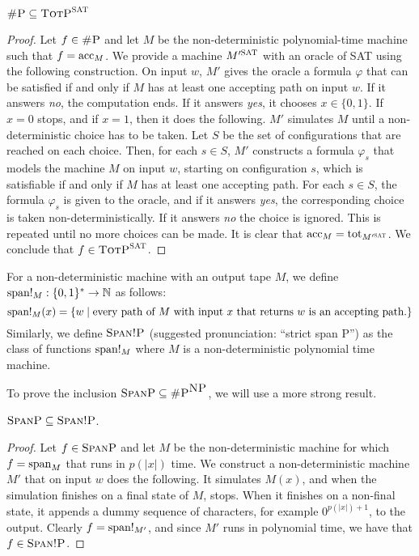 \begin{theo}
	$\shp \subseteq \totp^{\textsc{SAT}}$
\end{theo}
\begin{proof}
	Let $f\in\shp$ and let $M$ be the non-deterministic polynomial-time machine such that $f = \acc_M$. We provide a machine $M'^{\textsc{SAT}}$ with an oracle of SAT using the following construction. On input $w$, $M'$ gives the oracle a formula $\varphi$ that can be satisfied if and only if $M$ has at least one accepting path on input $w$. If it answers {\it no}, the computation ends. If it answers {\it yes}, it chooses $x\in\{0,1\}$. If $x = 0$ stops, and if $x = 1$, then it does the following. $M'$ simulates $M$ until a non-deterministic choice has to be taken. Let $S$ be the set of configurations that are reached on each choice. Then, for each $s\in S$, $M'$ constructs a formula $\varphi_s$ that models the machine $M$ on input $w$, starting on configuration $s$, which is satisfiable if and only if $M$ has at least one accepting path. For each $s\in S$, the formula $\varphi_s$ is given to the oracle, and if it answers {\it yes}, the corresponding choice is taken non-deterministically. If it answers {\it no} the choice is ignored. This is repeated until no more choices can be made. It is clear that $\acc_M = \tot_{M'^{\textsc{SAT}}}$. We conclude that $f\in\totp^{\textsc{SAT}}$.
\end{proof}

For a non-deterministic machine with an output tape $M$, we define $\sp!_M:\{0,1\}^*\to\N$ as follows:
\[
	\sp!_M(x) = \{w \mid \text{every path of $M$ with input $x$ that returns $w$ is an accepting path.} \}
\]
Similarly, we define $\stspanp$ (suggested pronunciation: ``strict span P'') as the class of functions $\sp!_M$ where $M$ is a non-deterministic polynomial time machine.

To prove the inclusion $\spanp \subseteq \shp^{\np}$, we will use a more strong result.

\begin{theo}
	$\spanp \subseteq \stspanp$.
\end{theo}
\begin{proof}
	Let $f \in \spanp$ and let $M$ be the non-deterministic machine for which $f = \sp_M$ that runs in $p(\vert x \vert)$ time. We construct a non-deterministic machine $M'$ that on input $w$ does the following. It simulates $M(x)$, and when the simulation finishes on a final state of $M$, stops. When it finishes on a non-final state, it appends a dummy sequence of characters, for example $0^{p(\vert x \vert)+1}$, to the output. Clearly $f = \sp!_{M'}$, and since $M'$ runs in polynomial time, we have that $f \in \stspanp$.
\end{proof}

